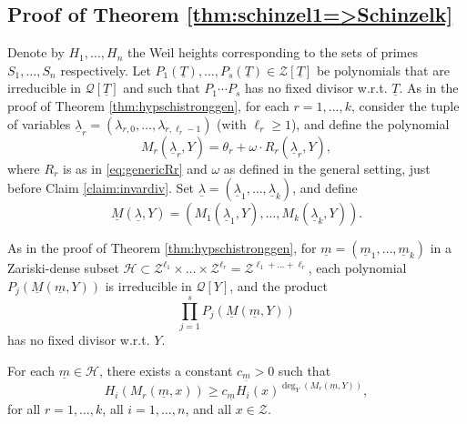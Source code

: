 \documentclass[11pt,a4paper,reqno]{amsart}
\theoremstyle{definition}
\begin{document}




\subsection{Proof of Theorem \ref{thm:schinzel1=>Schinzelk}} \label{ssec:pf-schinzel1=>Schinzelk}
Denote by $H_1,\dots,H_n$ the Weil heights corresponding to the sets of primes $S_1,\dots,S_n$ respectively. Let $P_1(\underline{T}),\dots,P_s(\underline T) \in \mathcal{Z}[\underline T]$ be polynomials that are irreducible in $\mathcal{Q}[\underline T]$ and such that
$
P_1 \cdots P_s
$ has no fixed divisor w.r.t. $\underline{T}$. As in the proof of Theorem \ref{thm:hypschistronggen}, for each $r=1,\dots,k$, consider the tuple of variables $\underline{\lambda}_r=(\lambda_{r,0},\dots,\lambda_{r,\ell_r-1})$ (with $\ell_r \geq 1$), and define the polynomial 
$$
M_r(\underline{\lambda}_r,Y)=\theta_r+ \omega \cdot R_r(\underline{\lambda}_r,Y),
$$ where $R_r$ is as in \eqref{eq:genericRr} and $\omega$ as defined in the general setting, just before Claim \ref{claim:invardiv}. Set $\underline{\lambda}=(\underline{\lambda}_1,\dots,\underline{\lambda}_k)$, and define
$$
\underline{M}(\underline{\lambda},Y)=(M_1(\underline{\lambda}_1,Y),\dots,M_k(\underline{\lambda}_k,Y)).
$$

As in the proof of Theorem \ref{thm:hypschistronggen}, for 
$\underline{m}=(\underline{m}_1,\dots,\underline{m}_k)$ in a Zariski-dense subset  $ \mathcal H \subset \mathcal{Z}^{\ell_1} \times \dots \times \mathcal{Z}^{\ell_r}=\mathcal{Z}^{\ell_1+ \dots+ \ell_r}$, each polynomial
$
P_j(\underline{M}(\underline{m},Y)) 
$ is irreducible in $\mathcal{Q}[Y]$, and the product
$$
\prod_{j=1}^s P_j(\underline{M}(\underline m ,Y))
$$ has no fixed divisor w.r.t. $Y$. 

For each $\underline{m} \in \mathcal{H}$, there exists a constant $c_{\underline{m}} >0$ such that
\begin{equation}\label{eq:minweilheigh}
H_i(M_r(\underline{m},x)) \geq c_{\underline{m}}H_i(x)^{\deg_Y(M_{r}(\underline{m},Y))},
\end{equation} for all $r=1,\dots,k$, all $i=1,\dots,n$, and all $x \in \mathcal{Z}$.
\end{document}
